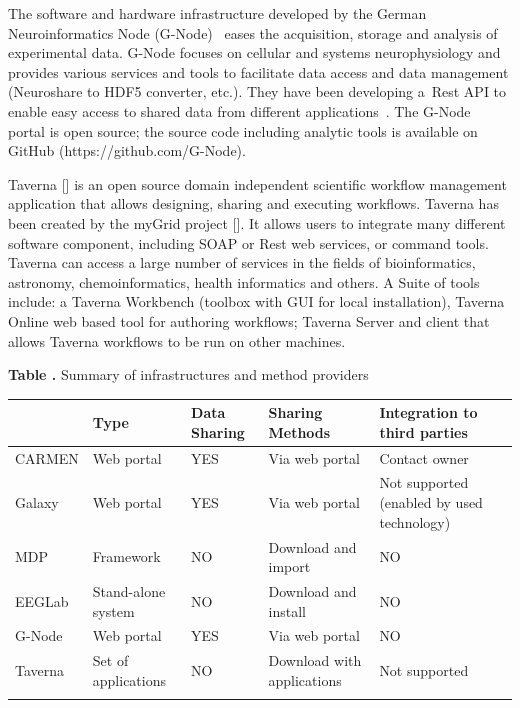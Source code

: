 \documentclass{frontiersSCNS} %
\begin{document}
The software and hardware infrastructure developed by the German Neuroinformatics Node (G-Node)~\cite{Herz08, GNode} eases the acquisition, storage and analysis of experimental data. G-Node focuses on cellular and systems neurophysiology and provides various services and tools to facilitate data access and data management (Neuroshare \cite{Neuroshare} to HDF5 converter, etc.). They have been developing a~Rest API to enable easy access to shared data from different applications~\cite{Sobolev14}. The G-Node portal is open source; the source code including analytic tools is available on GitHub (https://github.com/G-Node).

Taverna [] is an open source domain independent scientific workflow management application that allows designing, sharing and executing workflows. Taverna has been created by the myGrid project []. It allows users to integrate many different software component, including SOAP or Rest web services, or command tools. Taverna can access a large number of services in the fields of bioinformatics, astronomy, chemoinformatics, health informatics and others. A Suite of tools include: a Taverna Workbench (toolbox with GUI for local installation), Taverna Online web based tool for authoring workflows; Taverna Server and client that allows Taverna workflows to be run on other machines.

\begin{table}[!t]
\textbf{\label{Tab:01} Table .}{ Summary of infrastructures and method providers }

\processtable{ }
{\begin{tabular}{lllll}\toprule
 & Type & Data Sharing & Sharing Methods & Integration to third parties \\\midrule

CARMEN & Web portal & YES & Via web portal & Contact owner\\\midrule
Galaxy &  Web portal & YES & Via web portal & Not supported (enabled by used technology)\\\midrule
MDP & Framework & NO & Download and import & NO\\\midrule
EEGLab & Stand-alone system & NO & Download and install & NO\\\midrule
G-Node & Web portal & YES & Via web portal & NO\\\midrule
Taverna & Set of applications & NO & Download with applications & Not supported\\\botrule
\end{tabular}}{}
\end{table}
\end{document}
